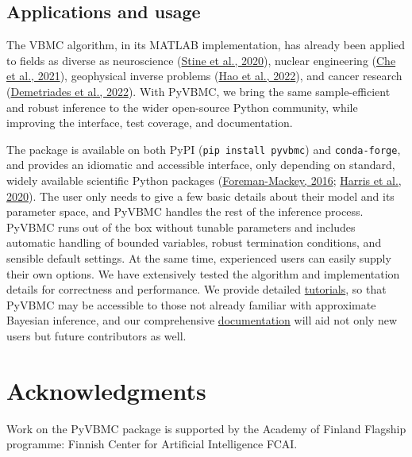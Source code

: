\documentclass[
]{article}
\begin{document}
\hypertarget{applications-and-usage}{%
\subsection{Applications and usage}\label{applications-and-usage}}

The VBMC algorithm, in its MATLAB implementation, has already been
applied to fields as diverse as neuroscience
(\protect\hyperlink{ref-stine_differentiating_2020}{Stine et al.,
2020}), nuclear engineering
(\protect\hyperlink{ref-che_application_2021}{Che et al., 2021}),
geophysical inverse problems
(\protect\hyperlink{ref-hao_application_2022}{Hao et al., 2022}), and
cancer research
(\protect\hyperlink{ref-demetriades_interrogating_2022}{Demetriades et
al., 2022}). With PyVBMC, we bring the same sample-efficient and robust
inference to the wider open-source Python community, while improving the
interface, test coverage, and documentation.

The package is available on both PyPI (\texttt{pip\ install\ pyvbmc})
and \texttt{conda-forge}, and provides an idiomatic and accessible
interface, only depending on standard, widely available scientific
Python packages
(\protect\hyperlink{ref-foreman-mackey_corner_2016}{Foreman-Mackey,
2016}; \protect\hyperlink{ref-harris_array_2020}{Harris et al., 2020}).
The user only needs to give a few basic details about their model and
its parameter space, and PyVBMC handles the rest of the inference
process. PyVBMC runs out of the box without tunable parameters and
includes automatic handling of bounded variables, robust termination
conditions, and sensible default settings. At the same time, experienced
users can easily supply their own options. We have extensively tested
the algorithm and implementation details for correctness and
performance. We provide detailed
\href{https://github.com/acerbilab/pyvbmc/tree/main/examples}{tutorials},
so that PyVBMC may be accessible to those not already familiar with
approximate Bayesian inference, and our comprehensive
\href{https://acerbilab.github.io/pyvbmc}{documentation} will aid not
only new users but future contributors as well.

\hypertarget{acknowledgments}{%
\section{Acknowledgments}\label{acknowledgments}}

Work on the PyVBMC package is supported by the Academy of Finland
Flagship programme: Finnish Center for Artificial Intelligence FCAI.
\end{document}
